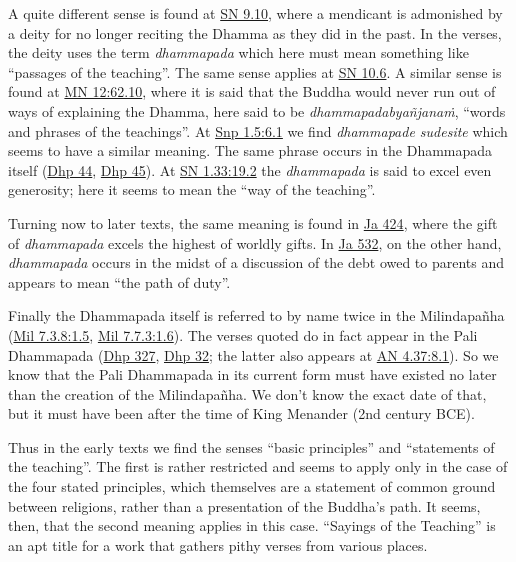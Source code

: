 \documentclass[12pt,openany]{book}%
\begin{document}
A quite different sense is found at \href{https://suttacentral.net/sn9.10/en/sujato}{SN 9.10}, where a mendicant is admonished by a deity for no longer reciting the Dhamma as they did in the past. In the verses, the deity uses the term \textit{dhammapada} which here must mean something like “passages of the teaching”.  The same sense applies at \href{https://suttacentral.net/sn10.6/en/sujato}{SN 10.6}. A similar sense is found at \href{https://suttacentral.net/mn12/en/sujato\#62.10}{MN 12:62.10}, where it is said that the Buddha would never run out of ways of explaining the Dhamma, here said to be \textit{\textsanskrit{dhammapadabyañjanaṁ}}, “words and phrases of the teachings”. At \href{https://suttacentral.net/snp1.5/en/sujato\#6.1}{Snp 1.5:6.1} we find \textit{dhammapade sudesite} which seems to have a similar meaning. The same phrase occurs in the Dhammapada itself (\href{https://suttacentral.net/dhp44/en/sujato}{Dhp 44}, \href{https://suttacentral.net/dhp45/en/sujato}{Dhp 45}). At \href{https://suttacentral.net/sn1.33/en/sujato\#19.2}{SN 1.33:19.2} the \textit{dhammapada} is said to excel even generosity; here it seems to mean the “way of the teaching”.

Turning now to later texts, the same meaning is found in \href{https://suttacentral.net/ja424/pli/ms}{Ja 424}, where the gift of \textit{dhammapada} excels the highest of worldly gifts. In \href{https://suttacentral.net/ja532/pli/ms}{Ja 532}, on the other hand, \textit{dhammapada} occurs in the midst of a discussion of the debt owed to parents and appears to mean “the path of duty”.

Finally the Dhammapada itself is referred to by name twice in the \textsanskrit{Milindapañha} (\href{https://suttacentral.net/mil7.3.8/pli/ms\#1.5}{Mil 7.3.8:1.5}, \href{https://suttacentral.net/mil7.7.3/pli/ms\#1.6}{Mil 7.7.3:1.6}). The verses quoted do in fact appear in the Pali Dhammapada (\href{https://suttacentral.net/dhp327/en/sujato}{Dhp 327}, \href{https://suttacentral.net/dhp32/en/sujato}{Dhp 32}; the latter also appears at \href{https://suttacentral.net/an4.37/en/sujato\#8.1}{AN 4.37:8.1}). So we know that the Pali Dhammapada in its current form must have existed no later than the creation of the \textsanskrit{Milindapañha}. We don’t know the exact date of that, but it must have been after the time of King Menander (2nd century BCE).

Thus in the early texts we find the senses “basic principles” and “statements of the teaching”. The first is rather restricted and seems to apply only in the case of the four stated principles, which themselves are a statement of common ground between religions, rather than a presentation of the Buddha’s path. It seems, then, that the second meaning applies in this case. “Sayings of the Teaching” is an apt title for a work that gathers pithy verses from various places.
\end{document}
